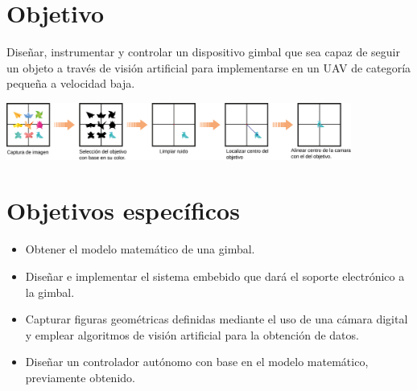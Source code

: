 \section{Objetivo}
Diseñar, instrumentar y controlar un dispositivo gimbal que sea capaz de seguir un objeto a través de visión artificial para 
implementarse en un UAV de categoría pequeña a velocidad baja.
\begin{center}
    \includegraphics[width=0.85\textwidth]{Capitulo1/Fig0.eps}       
    \label{Fig1}
\end{center}

\section{Objetivos específicos}
\begin{itemize}
    \item Obtener el modelo matemático de una gimbal.
    \item Diseñar e implementar el sistema embebido que dará el soporte electrónico a la gimbal.
    \item Capturar figuras geométricas definidas  mediante el uso de una cámara digital y emplear algoritmos de visión artificial para la obtención de datos. 
    \item Diseñar un controlador autónomo con base en el modelo matemático, previamente obtenido.
    \end{itemize}

